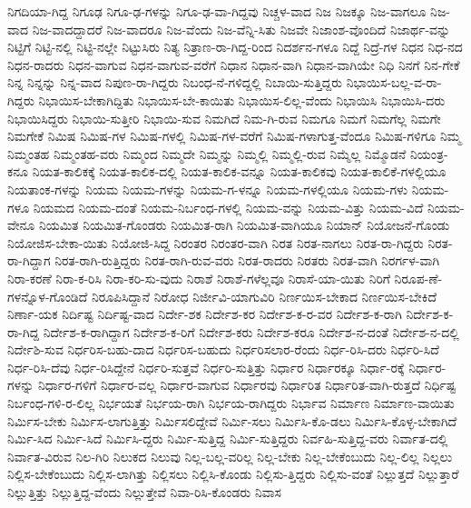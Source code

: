 {ನಿಗದಿಯಾ-ಗಿದ್ದ
ನಿಗೂಢ
ನಿಗೂ-ಢ-ಗಳನ್ನು
ನಿಗೂ-ಢ-ವಾ-ಗಿದ್ದವು
ನಿಚ್ಚಳ-ವಾದ
ನಿಜ
ನಿಜಕ್ಕೂ
ನಿಜ-ವಾಗಲೂ
ನಿಜ-ವಾದ
ನಿಜ-ವಾದದ್ದಾದರೆ
ನಿಜ-ವಾದರೂ
ನಿಜ-ವೆಂದು
ನಿಜ-ವೆನ್ನಿ-ಸಿತು
ನಿಜವೇ
ನಿಜಾಂಶ-ವೊಂದಿದೆ
ನಿಜಾರ್ಥ-ವನ್ನು
ನಿಟ್ಟಿಗೆ
ನಿಟ್ಟಿ-ನಲ್ಲಿ
ನಿಟ್ಟಿ-ನಲ್ಲೇ
ನಿಟ್ಟುಸಿರು
ನಿತ್ಯ
ನಿತ್ರಾಣ-ರಾ-ಗಿದ್ದ-ರಿಂದ
ನಿದರ್ಶನ-ಗಳೂ
ನಿದ್ದೆ
ನಿದ್ರೆ-ಗಳ
ನಿಧನ
ನಿಧ-ನದ
ನಿಧನ-ರಾದರು
ನಿಧನ-ವಾಗುವ
ನಿಧನ-ವಾಗುವ-ವರೆಗೆ
ನಿಧಾನ
ನಿಧಾನ-ವಾಗಿ
ನಿಧಾನ-ವಾಗಿಯೇ
ನಿಧಿ
ನಿನಗೆ
ನಿನ-ಗೇಕೆ
ನಿನ್ನ
ನಿನ್ನನ್ನು
ನಿನ್ನ-ವಾದ
ನಿಪುಣ-ರಾ-ಗಿದ್ದರು
ನಿಬಂಧ-ನೆ-ಗಳಿದ್ದಲ್ಲಿ
ನಿಬಾಯಿ-ಸುತ್ತಿದ್ದರು
ನಿಭಾಯಿಸ-ಬಲ್ಲ-ವ-ರಾ-ಗಿದ್ದರು
ನಿಭಾಯಿಸ-ಬೇಕಾಗಿದ್ದಿತು
ನಿಭಾಯಿಸ-ಬೇ-ಕಾಯಿತು
ನಿಭಾಯಿಸ-ಲಿಲ್ಲ-ವೆಂದು
ನಿಭಾಯಿಸಿ
ನಿಭಾಯಿಸಿ-ದರು
ನಿಭಾಯಿಸಿದ್ದರು
ನಿಭಾಯಿ-ಸುತ್ತೀರಿ
ನಿಭಾಯಿ-ಸುವ
ನಿಮಗಿದೆ
ನಿಮ-ಗಿ-ರುವ
ನಿಮಗೂ
ನಿಮಗೆ
ನಿಮಗೆಲ್ಲ
ನಿಮಗೇ
ನಿಮಗೇಕೆ
ನಿಮಿಷ
ನಿಮಿಷ-ಗಳ
ನಿಮಿಷ-ಗಳಲ್ಲಿ
ನಿಮಿಷ-ಗಳ-ವರೆಗೆ
ನಿಮಿಷ-ಗಳಾಗುತ್ತ-ವೆಂದೂ
ನಿಮಿಷ-ಗಳಿಗೂ
ನಿಮ್ಮ
ನಿಮ್ಮಂತಹ
ನಿಮ್ಮಂತಹ-ವರು
ನಿಮ್ಮಂದ
ನಿಮ್ಮದೇ
ನಿಮ್ಮನ್ನು
ನಿಮ್ಮಲ್ಲಿ
ನಿಮ್ಮಲ್ಲಿ-ರುವ
ನಿಮ್ಮೆಲ್ಲ
ನಿಮ್ಮೊಡನೆ
ನಿಯಂತ್ರ-ಕನೂ
ನಿಯತ-ಕಾಲಿಕಕ್ಕೆ
ನಿಯತ-ಕಾಲಿಕ-ದಲ್ಲಿ
ನಿಯತ-ಕಾಲಿಕ-ವನ್ನೂ
ನಿಯತ-ಕಾಲಿಕವು
ನಿಯತ-ಕಾಲಿಕೆ-ಗಳಲ್ಲಿಯೂ
ನಿಯತಾಂಕ-ಗಳನ್ನು
ನಿಯಮ
ನಿಯಮ-ಗಳನ್ನು
ನಿಯಮ-ಗ-ಳನ್ನೂ
ನಿಯಮ-ಗಳಲ್ಲಿಯೂ
ನಿಯಮ-ಗಳು
ನಿಯಮ-ಗಳೂ
ನಿಯಮದ
ನಿಯಮ-ದಂತೆ
ನಿಯಮ-ನಿರ್ಬಂಧ-ಗಳಲ್ಲಿ
ನಿಯಮ-ವನ್ನು
ನಿಯಮ-ವಿತ್ತು
ನಿಯಮ-ವಿದೆ
ನಿಯಮ-ವೇನೂ
ನಿಯಮಿತ
ನಿಯಮಿತ-ಗೊಂಡರು
ನಿಯಮಿತ-ರಾಗಿ
ನಿಯಮಿತ-ವಾಗಿಯೂ
ನಿಯಾನ್
ನಿಯೋಜನೆ-ಗೊಂಡು
ನಿಯೋಜಿಸ-ಬೇಕಾ-ಯಿತು
ನಿಯೋಜಿ-ಸಿದ್ದ
ನಿರಂತರ
ನಿರಂತರ-ವಾಗಿ
ನಿರತ
ನಿರತ-ನಾಗಲು
ನಿರತ-ರಾ-ಗಿದ್ದರು
ನಿರತ-ರಾ-ಗಿದ್ದಾಗ
ನಿರತ-ರಾಗಿ-ರುತ್ತಿದ್ದರು
ನಿರತ-ರಾಗಿ-ರುವ-ವರು
ನಿರತ-ರಾದರು
ನಿರತರು
ನಿರತ-ವಾಗಿ
ನಿರರ್ಗಳ-ವಾಗಿ
ನಿರಾ-ಕರಣೆ
ನಿರಾ-ಕ-ರಿಸಿ
ನಿರಾ-ಕರಿ-ಸು-ವುದು
ನಿರಾಶೆ
ನಿರಾಶೆ-ಗಳೆಲ್ಲವೂ
ನಿರಾಸೆ-ಯಾ-ಯಿತು
ನಿರಿಗೆ
ನಿರೂಪ-ಣೆ-ಗಳನ್ನೊಳ-ಗೊಂಡಿದೆ
ನಿರೂಪಿಸಿದ್ದಾನೆ
ನಿರೋಧ
ನಿರ್ಜೀವಿ-ಯಾಗುವಿರಿ
ನಿರ್ಣಯಿಸ-ಬೇಕಾದ
ನಿರ್ಣಯಿಸ-ಬೇಕಿದೆ
ನಿರ್ಣಾ-ಯಕ
ನಿರ್ದಿಷ್ಟ
ನಿರ್ದಿಷ್ಟ-ವಾದ
ನಿರ್ದೇ-ಶಕ
ನಿರ್ದೇಶ-ಕರ
ನಿರ್ದೇಶ-ಕ-ರ-ವರ
ನಿರ್ದೇಶ-ಕ-ರಾಗಿ
ನಿರ್ದೇಶ-ಕ-ರಾ-ಗಿದ್ದ
ನಿರ್ದೇಶ-ಕ-ರಾಗಿದ್ದಾಗ
ನಿರ್ದೇಶ-ಕ-ರಿಗೆ
ನಿರ್ದೇಶ-ಕರು
ನಿರ್ದೇಶ-ಕರೂ
ನಿರ್ದೇಶ-ನ-ದಂತೆ
ನಿರ್ದೇಶ-ನ-ದಲ್ಲಿ
ನಿರ್ದೇಶಿ-ಸುವ
ನಿರ್ಧರಿಸ-ಬಹು-ದಾದ
ನಿರ್ಧರಿಸ-ಬಹುದು
ನಿರ್ಧರಿಸಲಾರ-ರೆಂದು
ನಿರ್ಧ-ರಿಸಿ-ದರು
ನಿರ್ಧರಿ-ಸಿದೆ
ನಿರ್ಧ-ರಿಸಿ-ದೆವು
ನಿರ್ಧ-ರಿಸಿದ್ದೇನೆ
ನಿರ್ಧರಿ-ಸುತ್ತವೆ
ನಿರ್ಧರಿ-ಸುತ್ತಿತ್ತು
ನಿರ್ಧಾರ
ನಿರ್ಧಾರಕ್ಕೂ
ನಿರ್ಧಾ-ರಕ್ಕೆ
ನಿರ್ಧಾರ-ಗಳನ್ನು
ನಿರ್ಧಾರ-ಗಳಿಗೆ
ನಿರ್ಧಾರ-ವಲ್ಲ
ನಿರ್ಧಾರ-ವಾಗುವ
ನಿರ್ಧಾರವು
ನಿರ್ಧಾರಿತ
ನಿರ್ಧಾರಿತ-ವಾಗಿ-ರುತ್ತದೆ
ನಿರ್ಧಿಷ್ಟ
ನಿರ್ಬಂಧ-ಗಳಿ-ರ-ಲಿಲ್ಲ
ನಿರ್ಭಯತೆ
ನಿರ್ಭಯ-ರಾಗಿ
ನಿರ್ಭಯ-ರಾಗಿದ್ದರು
ನಿರ್ಭಾವ
ನಿರ್ಮಾಣ
ನಿರ್ಮಾಣ-ವಾಯಿತು
ನಿರ್ಮಿಸ-ಬೇಕು
ನಿರ್ಮಿಸ-ಲಾಗುತ್ತಿತ್ತು
ನಿರ್ಮಿಸಲಿದ್ದೇವೆ
ನಿರ್ಮಿ-ಸಲು
ನಿರ್ಮಿಸಿ-ಕೊ-ಡಲು
ನಿರ್ಮಿಸಿ-ಕೊಳ್ಳ-ಬೇಕಾಗಿದೆ
ನಿರ್ಮಿ-ಸಿದ
ನಿರ್ಮಿ-ಸಿದೆ
ನಿರ್ಮಿಸಿ-ದ್ದರು
ನಿರ್ಮಿ-ಸುತ್ತಿದ್ದ
ನಿರ್ಮಿ-ಸುತ್ತಿದ್ದರು
ನಿರ್ವಹಿ-ಸುತ್ತಿದ್ದ-ವರು
ನಿರ್ವಾತ-ದಲ್ಲಿ
ನಿರ್ವಾತ-ವಿರುವ
ನಿಲ-ಗಿರಿ
ನಿಲುಕದ
ನಿಲುವು
ನಿಲ್ಲ-ಬಲ್ಲ-ವರಿಲ್ಲ
ನಿಲ್ಲ-ಬೇಕು
ನಿಲ್ಲ-ಬೇಕೆಂಬುದು
ನಿಲ್ಲ-ಲಿಲ್ಲ
ನಿಲ್ಲಲು
ನಿಲ್ಲಿಸ-ಬೇಕೆಂಬುದು
ನಿಲ್ಲಿಸ-ಲಾಗಿತ್ತು
ನಿಲ್ಲಿಸಲು
ನಿಲ್ಲಿಸಿ-ಕೊಂಡು
ನಿಲ್ಲಿಸು-ತ್ತಿದ್ದರು
ನಿಲ್ಲಿಸು-ವಂತೆ
ನಿಲ್ಲುತ್ತದೆ
ನಿಲ್ಲುತ್ತಾರೆ
ನಿಲ್ಲುತ್ತಿತ್ತು
ನಿಲ್ಲುತ್ತಿದ್ದ-ವೆಂದು
ನಿಲ್ಲುತ್ತೇವೆ
ನಿವಾ-ರಿಸಿ-ಕೊಂಡರು
ನಿವಾಸ
}
